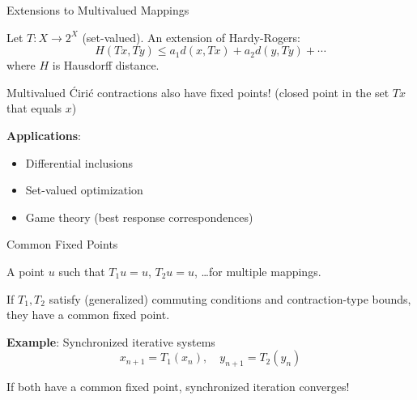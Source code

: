 \documentclass[aspectratio=169,10pt]{beamer}
\begin{document}
\begin{frame}{Extensions to Multivalued Mappings}
    \begin{definition}
        Let $T : X \to 2^X$ (set-valued). An extension of Hardy-Rogers:
        \begin{equation*}
            H(Tx, Ty) \leq a_1 d(x, Tx) + a_2 d(y, Ty) + \cdots
        \end{equation*}
        where $H$ is Hausdorff distance.
    \end{definition}

    \begin{theorem}
        Multivalued Ćirić contractions also have fixed points!
        (closed point in the set $Tx$ that equals $x$)
    \end{theorem}

    \vspace{0.4cm}
    \textbf{Applications}:
    \begin{itemize}
        \item Differential inclusions
        \item Set-valued optimization
        \item Game theory (best response correspondences)
    \end{itemize}
\end{frame}

\begin{frame}{Common Fixed Points}
    \begin{definition}
        A point $u$ such that $T_1 u = u$, $T_2 u = u$, \ldots for multiple mappings.
    \end{definition}

    \begin{theorem}
        If $T_1, T_2$ satisfy (generalized) commuting conditions and
        contraction-type bounds, they have a common fixed point.
    \end{theorem}

    \vspace{0.4cm}
    \textbf{Example}: Synchronized iterative systems
    \begin{equation*}
        x_{n+1} = T_1(x_n), \quad y_{n+1} = T_2(y_n)
    \end{equation*}

    If both have a common fixed point, synchronized iteration converges!
\end{frame}

\end{document}
